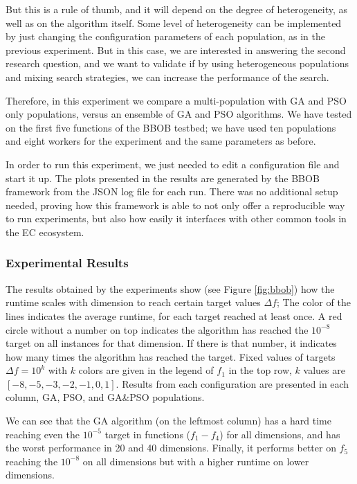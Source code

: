 \documentclass[review]{elsarticle}
\begin{document}
But this is a rule of thumb, and it will depend on the degree of heterogeneity,
as well as on the algorithm itself. Some level of heterogeneity can be
implemented by just changing the configuration parameters of each population,
as in the previous experiment. But in this case, we are interested in
answering the second research question, and we want to validate if by using
heterogeneous populations and mixing search strategies,  we can increase the performance of the
search.

Therefore, in this experiment we compare a multi-population with GA and PSO only populations,
versus an ensemble of GA and PSO algorithms. We have tested on the first five functions of the
BBOB testbed; we have used ten populations and eight workers for the experiment and the
same parameters as before.

In order to run this experiment, we just needed to edit a configuration file and
start it up. The plots presented in the results are generated by the BBOB
framework from the JSON log file for each run. There was no additional setup
needed, proving how this framework is able to not only offer a reproducible way
to run experiments, but also how easily it interfaces with other common tools in
the EC ecosystem.

\subsubsection{Experimental Results} 

The results obtained by the experiments show (see Figure \ref{fig:bbob}) how
the runtime scales with dimension to reach certain target values $\Delta f$;
The color of the lines indicates the average runtime, for each target reached
at least once. A red circle without a number on top indicates the algorithm
has reached the $10^{-8}$ target on all instances for that dimension. If there
is that number, it indicates how many times the algorithm has reached
the target. Fixed values of targets $\Delta f = 10^{k}$ with $k$ colors are
given in the legend of $f_1$ in the top row, $k$ values are $[-8,-5,-3,-2,-1,0,1]$. Results
from each configuration are presented in each column, GA, PSO, and GA\&PSO
populations. 

We can see that the GA algorithm (on the leftmost column) has a hard time reaching even the
$10^{-5}$ target in functions ($f_1-f_4$) for all dimensions, and has the worst
performance in 20 and 40 dimensions. Finally, it performs better on $f_5$
reaching the $10^{-8}$ on all dimensions but with a higher runtime on lower
dimensions.
\end{document}
